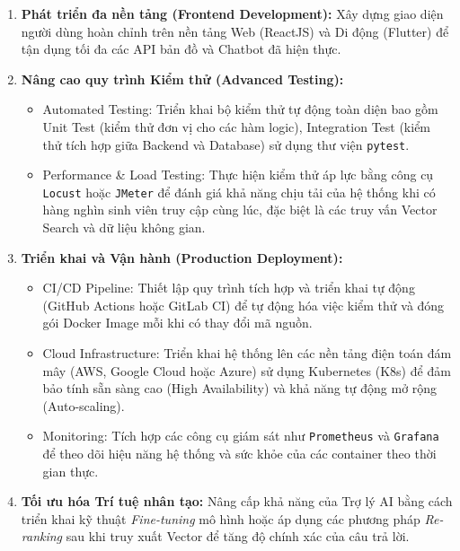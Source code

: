 \begin{enumerate}[leftmargin=*]
\item \textbf{Phát triển đa nền tảng (Frontend Development):}
Xây dựng giao diện người dùng hoàn chỉnh trên nền tảng Web (ReactJS) và Di động (Flutter) để tận dụng tối đa các API bản đồ và Chatbot đã hiện thực.

\item \textbf{Nâng cao quy trình Kiểm thử (Advanced Testing):}
\begin{itemize}
    \item Automated Testing: Triển khai bộ kiểm thử tự động toàn diện bao gồm Unit Test (kiểm thử đơn vị cho các hàm logic), Integration Test (kiểm thử tích hợp giữa Backend và Database) sử dụng thư viện \texttt{pytest}.
    \item Performance \& Load Testing: Thực hiện kiểm thử áp lực bằng công cụ \texttt{Locust} hoặc \texttt{JMeter} để đánh giá khả năng chịu tải của hệ thống khi có hàng nghìn sinh viên truy cập cùng lúc, đặc biệt là các truy vấn Vector Search và dữ liệu không gian.
\end{itemize}

\item \textbf{Triển khai và Vận hành (Production Deployment):}
\begin{itemize}
    \item CI/CD Pipeline: Thiết lập quy trình tích hợp và triển khai tự động (GitHub Actions hoặc GitLab CI) để tự động hóa việc kiểm thử và đóng gói Docker Image mỗi khi có thay đổi mã nguồn.
    \item Cloud Infrastructure: Triển khai hệ thống lên các nền tảng điện toán đám mây (AWS, Google Cloud hoặc Azure) sử dụng Kubernetes (K8s) để đảm bảo tính sẵn sàng cao (High Availability) và khả năng tự động mở rộng (Auto-scaling).
    \item Monitoring: Tích hợp các công cụ giám sát như \texttt{Prometheus} và \texttt{Grafana} để theo dõi hiệu năng hệ thống và sức khỏe của các container theo thời gian thực.
\end{itemize}

\item \textbf{Tối ưu hóa Trí tuệ nhân tạo:} 
Nâng cấp khả năng của Trợ lý AI bằng cách triển khai kỹ thuật \textit{Fine-tuning} mô hình hoặc áp dụng các phương pháp \textit{Re-ranking} sau khi truy xuất Vector để tăng độ chính xác của câu trả lời.
\end{enumerate}